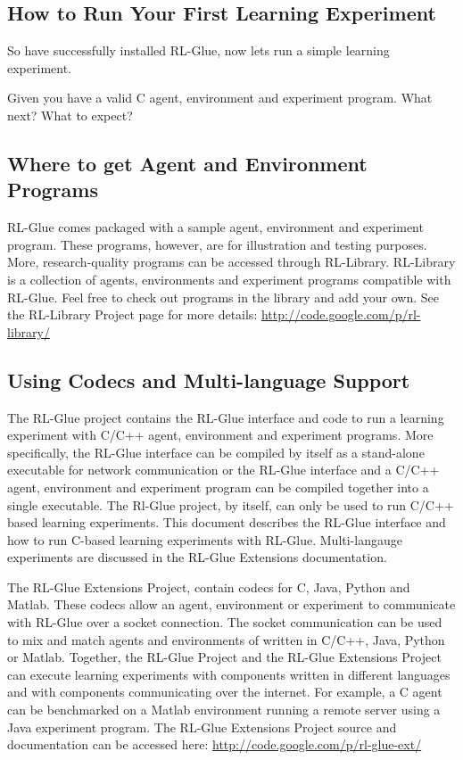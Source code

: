 \documentclass[11pt]{article}
\begin{document}
\subsection{How to Run Your First Learning Experiment}
So have successfully installed RL-Glue, now lets run a simple learning experiment. 


Given you have a valid C agent, environment and experiment program. What next? What to expect?

\label{quick}

\subsection{Where to get Agent and Environment Programs}
RL-Glue comes packaged with a sample agent, environment and experiment program. These programs, however, are for illustration and testing purposes. More, research-quality programs can be accessed through RL-Library. RL-Library is a collection of agents, environments and experiment programs compatible with RL-Glue. Feel free to check out programs in the library and add your own. See the RL-Library Project page for more details: \url{http://code.google.com/p/rl-library/}   

\subsection{Using Codecs and Multi-language Support}
The RL-Glue project contains the RL-Glue interface and code to run a learning experiment with C/C++ agent, environment and experiment programs. More specifically, the RL-Glue interface can be compiled by itself as a stand-alone executable for network communication or the RL-Glue interface and a C/C++ agent, environment and experiment program can be compiled together into a single executable. The Rl-Glue project, by itself, can only be used to run C/C++ based learning experiments. This document describes the RL-Glue interface and how to run C-based learning experiments with RL-Glue. Multi-langauge experiments are discussed in the RL-Glue Extensions documentation.

The RL-Glue Extensions Project, contain codecs for C, Java, Python and Matlab. These codecs allow an agent, environment or experiment to communicate with RL-Glue over a socket connection. The socket communication can be used to mix and match agents and environments of written in C/C++, Java, Python or Matlab. Together, the RL-Glue Project and the RL-Glue Extensions Project can execute learning experiments with components written in different languages and with components communicating over the internet. For example, a C agent can be benchmarked on a Matlab environment running a remote server using a Java experiment program. The RL-Glue Extensions Project source and documentation can be accessed here: 
{\url {http://code.google.com/p/rl-glue-ext/}}
\end{document}
